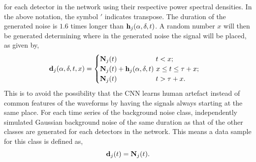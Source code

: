 \documentclass[aps,twocolumn,showpacs,groupedaddress, nofootinbib]{revtex4}  %
\begin{document}
for each detector in the network using their respective power spectral densities.  
In the above notation, the symbol $'$ indicates transpose. 
The duration of the generated noise is $1.6$ times longer than $ \bold{h}_j(\alpha, \delta, t)$. 
A random number $x$ will then be generated determining where in the generated noise the signal will be placed, as given by,
\begin{equation}
\bold{d}_j(\alpha, \delta, t, x)=
\begin{cases}
\bold{N}_j(t)~~~~~~~~~~~~~~~~~t < x; \\
\bold{N}_j(t) + \bold{h}_j(\alpha, \delta, t)~x \leq t \leq \tau + x; \\
\bold{N}_j(t)~~~~~~~~~~~~~~~~~t > \tau + x. \\
\end{cases}
\end{equation}
This is to avoid the possibility that the \ac{CNN} learns human artefact instead of common features of the waveforms by having the signals always starting at the same place.
For each time series of the background noise class, independently simulated Gaussian background noise of the same duration as that of the other classes 
are generated for each detectors in the network.
This means a data sample for this class is defined as,
\begin{equation}\label{eq:noise}
 \bold{d}_j(t) = \bold{N}_j(t).
\end{equation}
\end{document}
